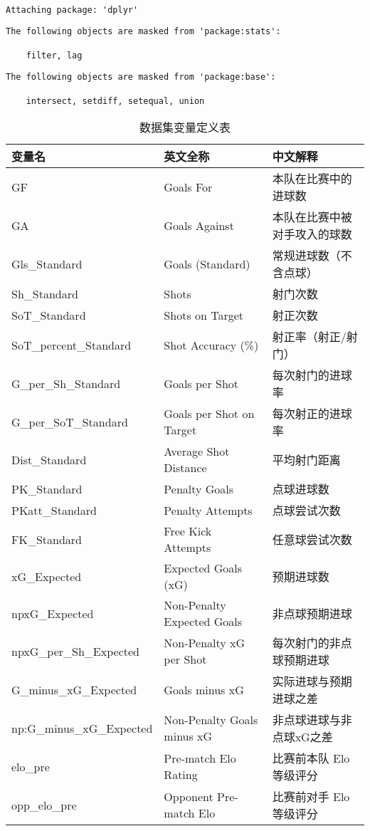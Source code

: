 \documentclass[
]{ctexart}
\begin{document}
\begin{verbatim}

Attaching package: 'dplyr'
\end{verbatim}

\begin{verbatim}
The following objects are masked from 'package:stats':

    filter, lag
\end{verbatim}

\begin{verbatim}
The following objects are masked from 'package:base':

    intersect, setdiff, setequal, union
\end{verbatim}

\begin{table}

\caption{数据集变量定义表}
\centering
\begin{tabular}[t]{lll}
\toprule
变量名 & 英文全称 & 中文解释\\
\midrule
GF & Goals For & 本队在比赛中的进球数\\
GA & Goals Against & 本队在比赛中被对手攻入的球数\\
Gls\_Standard & Goals (Standard) & 常规进球数（不含点球）\\
Sh\_Standard & Shots & 射门次数\\
SoT\_Standard & Shots on Target & 射正次数\\
\addlinespace
SoT\_percent\_Standard & Shot Accuracy (\%) & 射正率（射正/射门）\\
G\_per\_Sh\_Standard & Goals per Shot & 每次射门的进球率\\
G\_per\_SoT\_Standard & Goals per Shot on Target & 每次射正的进球率\\
Dist\_Standard & Average Shot Distance & 平均射门距离\\
PK\_Standard & Penalty Goals & 点球进球数\\
\addlinespace
PKatt\_Standard & Penalty Attempts & 点球尝试次数\\
FK\_Standard & Free Kick Attempts & 任意球尝试次数\\
xG\_Expected & Expected Goals (xG) & 预期进球数\\
npxG\_Expected & Non-Penalty Expected Goals & 非点球预期进球\\
npxG\_per\_Sh\_Expected & Non-Penalty xG per Shot & 每次射门的非点球预期进球\\
\addlinespace
G\_minus\_xG\_Expected & Goals minus xG & 实际进球与预期进球之差\\
np:G\_minus\_xG\_Expected & Non-Penalty Goals minus xG & 非点球进球与非点球xG之差\\
elo\_pre & Pre-match Elo Rating & 比赛前本队 Elo 等级评分\\
opp\_elo\_pre & Opponent Pre-match Elo & 比赛前对手 Elo 等级评分\\
\bottomrule
\end{tabular}
\end{table}
\end{document}

